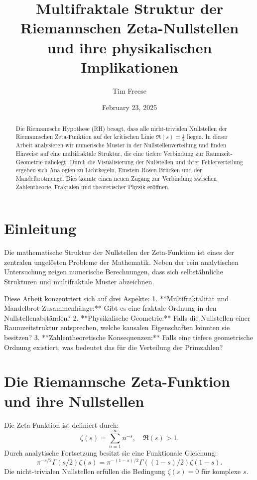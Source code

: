 \documentclass[a4paper,12pt]{article}
\title{Multifraktale Struktur der Riemannschen Zeta-Nullstellen \\ und ihre physikalischen Implikationen}
\author{Tim Freese}
\date{February 23, 2025}
\begin{document}
\maketitle

\begin{abstract}
Die Riemannsche Hypothese (RH) besagt, dass alle nicht-trivialen Nullstellen der Riemannschen Zeta-Funktion auf der kritischen Linie \( \Re(s) = \frac{1}{2} \) liegen. In dieser Arbeit analysieren wir numerische Muster in der Nullstellenverteilung und finden Hinweise auf eine multifraktale Struktur, die eine tiefere Verbindung zur Raumzeit-Geometrie nahelegt. Durch die Visualisierung der Nullstellen und ihrer Fehlerverteilung ergeben sich Analogien zu Lichtkegeln, Einstein-Rosen-Brücken und der Mandelbrotmenge. Dies könnte einen neuen Zugang zur Verbindung zwischen Zahlentheorie, Fraktalen und theoretischer Physik eröffnen.
\end{abstract}

\tableofcontents

\section{Einleitung}
Die mathematische Struktur der Nullstellen der Zeta-Funktion ist eines der zentralen ungelösten Probleme der Mathematik. Neben der rein analytischen Untersuchung zeigen numerische Berechnungen, dass sich selbstähnliche Strukturen und multifraktale Muster abzeichnen. 

Diese Arbeit konzentriert sich auf drei Aspekte:
1. **Multifraktalität und Mandelbrot-Zusammenhänge:** Gibt es eine fraktale Ordnung in den Nullstellenabständen?
2. **Physikalische Geometrie:** Falls die Nullstellen einer Raumzeitstruktur entsprechen, welche kausalen Eigenschaften könnten sie besitzen?
3. **Zahlentheoretische Konsequenzen:** Falls eine tiefere geometrische Ordnung existiert, was bedeutet das für die Verteilung der Primzahlen?

\section{Die Riemannsche Zeta-Funktion und ihre Nullstellen}
Die Zeta-Funktion ist definiert durch:
\begin{equation}
\zeta(s) = \sum_{n=1}^{\infty} n^{-s}, \quad \Re(s) > 1.
\end{equation}
Durch analytische Fortsetzung besitzt sie eine Funktionale Gleichung:
\begin{equation}
\pi^{-s/2} \Gamma(s/2) \zeta(s) = \pi^{-(1-s)/2} \Gamma((1-s)/2) \zeta(1-s).
\end{equation}
Die nicht-trivialen Nullstellen erfüllen die Bedingung \( \zeta(s) = 0 \) für komplexe \( s \).
\end{document}
